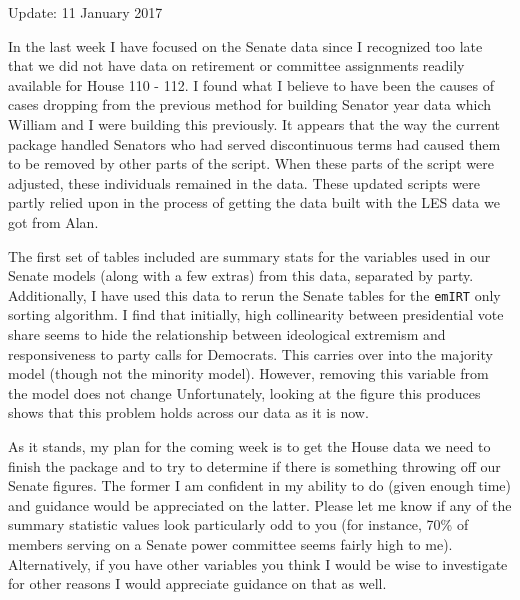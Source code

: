 \documentclass[12pt]{article}
\begin{document}
	
	\begin{center}
		Update: 11 January 2017
	\end{center}

In the last week I have focused on the Senate data since I recognized too late that we did not have data on retirement or committee assignments readily available for House 110 - 112. I found what I believe to have been the causes of cases dropping from the previous method for building Senator year data which William and I were building this previously. It appears that the way the current package handled Senators who had served discontinuous terms had caused them to be removed by other parts of the script. When these parts of the script were adjusted, these individuals remained in the data. These updated scripts were partly relied upon in the process of getting the data built with the LES data we got from Alan. 

The first set of tables included are summary stats for the variables used in our Senate models (along with a few extras) from this data, separated by party. Additionally, I have used this data to rerun the Senate tables for the \verb|emIRT| only sorting algorithm. I find that initially, high collinearity between presidential vote share seems to hide the relationship between ideological extremism and responsiveness to party calls for Democrats. This carries over into the majority model (though not the minority model). However, removing this variable from the model does not change  Unfortunately, looking at the figure this produces shows that this problem holds across our data as it is now.

As it stands, my plan for the coming week is to get the House data we need to finish the package and to try to determine if there is something throwing off our Senate figures. The former I am confident in my ability to do (given enough time) and guidance would be appreciated on the latter. Please let me know if any of the summary statistic values look particularly odd to you (for instance, 70\% of members serving on a Senate power committee seems fairly high to me). Alternatively, if you have other variables you think I would be wise to investigate for other reasons I would appreciate guidance on that as well.
\end{document}
